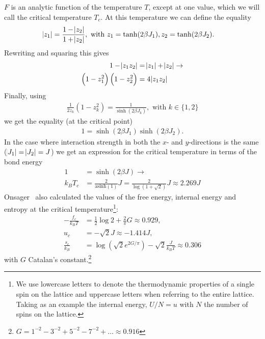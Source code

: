 \documentclass[11pt, a4paper]{report} %
\begin{document}
\(F\) is an analytic function of the temperature \(T\), except at one value, which we will call the critical temperature \(T_c\). At this temperature we can define the equality~\cite{mccoy:1973}
\begin{align}
	\abs{z_1} &= \frac{1 - \abs{z_2}}{1+ \abs{z_2}}, \text{ with } z_1 = \tanh(2\beta J_1), z_2 = \tanh(2\beta J_2).
\end{align}
Rewriting and squaring this gives
\begin{align}
	\label{eq:ising_z_functions}
	1 - \abs{z_1 z_2} &= \abs{z_1} + \abs{z_2}\rightarrow\\
	\left(1 - z_1^2 \right) \left(1 - z_2^2 \right) &= 4 \abs{z_1 z_2}
\end{align}
Finally, using
\begin{align}
	\frac{1}{2 z_k}\left(1 - z_k^2\right) = \frac{1}{\sinh(2 \beta J_k)}, \text{ with } k \in \{{1, 2}\}
\end{align}
we get the equality (at the critical point)
\begin{align}
	1 = \sinh(2\beta J_1) \sinh(2\beta J_2).
\end{align}
In the case where interaction strength in both the \(x\)- and \(y\)-directions is the same (\(\abs{J_1} = \abs{J_2} = J\)) we get an expression for the critical temperature in terms of the bond energy
\begin{align}
	1 &= \sinh(2\beta J) \to \\
	k_B T_c &= \frac{2}{\text{asinh}(1)}J = \frac{2}{\log(1+\sqrt{2})}J \approx 2.269 J
\end{align}
Onsager~\cite{onsager:1944} also calculated the values of the free energy, internal energy and entropy at the critical temperature\footnote{We use lowercase letters to denote the thermodynamic properties of a single spin on the lattice and uppercase letters when referring to the entire lattice. Taking as an example the internal energy, \(U/N = u\) with \(N\) the number of spins on the lattice.}:
\begin{align}
	-\frac{f_c}{k_B T} &= \frac{1}{2} \log{2} + \frac{2}{\pi} G \approx 0.929, \\
	u_c &= - \sqrt{2} J \approx - 1.414 J,\\
	\frac{s_c}{k_B} &= \log{(\sqrt{2} e^{2G/\pi})} - \sqrt{2} \frac{J}{k_B T} \approx 0.306
\end{align}
with \(G\) Catalan's constant.\footnote{\(G = 1^{-2} - 3^{-2} + 5^{-2} - 7^{-2} +\ldots \approx 0.916\)}
\end{document}
